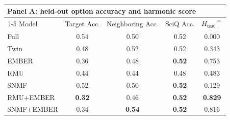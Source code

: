 \begin{table}[t]
  \centering
  \scriptsize
  \begin{tabular}{lcccc}
    \toprule
    \multicolumn{5}{l}{\textbf{Panel A: held-out option accuracy and harmonic score}} \\
    \cmidrule(lr){1-5}
    Model & Target Acc. & Neighboring Acc. & SciQ Acc. & $H_{\mathrm{test}}\uparrow$ \\
    \midrule
    Full  & 0.54 & 0.50 & 0.52 & 0.000 \\
    Twin  & 0.48 & 0.52 & 0.52 & 0.343 \\
    EMBER & 0.36 & 0.48 & \textbf{0.52} & 0.753 \\
    RMU   & 0.44 & 0.44 & 0.48 & 0.483 \\
    SNMF  & 0.52 & 0.50 & \textbf{0.52} & 0.129 \\
    RMU+EMBER & \textbf{0.32} & 0.46 & \textbf{0.52} & \textbf{0.829} \\
    SNMF+EMBER & 0.34 & \textbf{0.54} & \textbf{0.52} & 0.816 \\
    \bottomrule
  \end{tabular}


\end{table}

